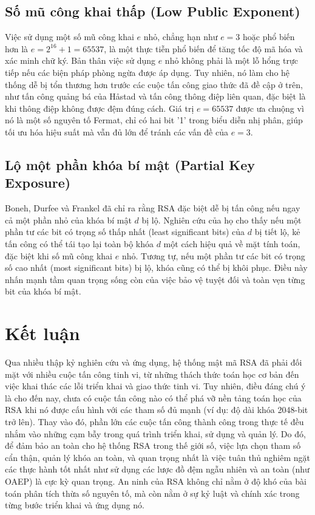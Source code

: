 \documentclass[12pt, a4paper]{article}
\begin{document}
\subsection{Số mũ công khai thấp (Low Public Exponent)}
Việc sử dụng một số mũ công khai $e$ nhỏ, chẳng hạn như $e=3$ hoặc phổ biến hơn là $e=2^{16}+1=65537$, là một thực tiễn phổ biến để tăng tốc độ mã hóa và xác minh chữ ký. Bản thân việc sử dụng $e$ nhỏ không phải là một lỗ hổng trực tiếp nếu các biện pháp phòng ngừa được áp dụng. Tuy nhiên, nó làm cho hệ thống dễ bị tổn thương hơn trước các cuộc tấn công giao thức đã đề cập ở trên, như tấn công quảng bá của Håstad và tấn công thông điệp liên quan, đặc biệt là khi thông điệp không được đệm đúng cách. Giá trị $e=65537$ được ưa chuộng vì nó là một số nguyên tố Fermat, chỉ có hai bit '1' trong biểu diễn nhị phân, giúp tối ưu hóa hiệu suất mà vẫn đủ lớn để tránh các vấn đề của $e=3$.

\subsection{Lộ một phần khóa bí mật (Partial Key Exposure)}
Boneh, Durfee và Frankel đã chỉ ra rằng RSA đặc biệt dễ bị tấn công nếu ngay cả một phần nhỏ của khóa bí mật $d$ bị lộ. Nghiên cứu của họ cho thấy nếu một phần tư các bit có trọng số thấp nhất (least significant bits) của $d$ bị tiết lộ, kẻ tấn công có thể tái tạo lại toàn bộ khóa $d$ một cách hiệu quả về mặt tính toán, đặc biệt khi số mũ công khai $e$ nhỏ. Tương tự, nếu một phần tư các bit có trọng số cao nhất (most significant bits) bị lộ, khóa cũng có thể bị khôi phục. Điều này nhấn mạnh tầm quan trọng sống còn của việc bảo vệ tuyệt đối và toàn vẹn từng bit của khóa bí mật.

\section{Kết luận}
Qua nhiều thập kỷ nghiên cứu và ứng dụng, hệ thống mật mã RSA đã phải đối mặt với nhiều cuộc tấn công tinh vi, từ những thách thức toán học cơ bản đến việc khai thác các lỗi triển khai và giao thức tinh vi. Tuy nhiên, điều đáng chú ý là cho đến nay, chưa có cuộc tấn công nào có thể phá vỡ nền tảng toán học của RSA khi nó được cấu hình với các tham số đủ mạnh (ví dụ: độ dài khóa 2048-bit trở lên). Thay vào đó, phần lớn các cuộc tấn công thành công trong thực tế đều nhắm vào những cạm bẫy trong quá trình triển khai, sử dụng và quản lý. Do đó, để đảm bảo an toàn cho hệ thống RSA trong thế giới số, việc lựa chọn tham số cẩn thận, quản lý khóa an toàn, và quan trọng nhất là việc tuân thủ nghiêm ngặt các thực hành tốt nhất như sử dụng các lược đồ đệm ngẫu nhiên và an toàn (như OAEP) là cực kỳ quan trọng. An ninh của RSA không chỉ nằm ở độ khó của bài toán phân tích thừa số nguyên tố, mà còn nằm ở sự kỷ luật và chính xác trong từng bước triển khai và ứng dụng nó.
\end{document}
